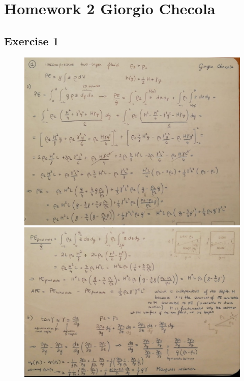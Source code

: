\documentclass[11pt,a4paper]{article}
\begin{document}
	
\section*{Homework 2  \hfill Giorgio Checola}
\subsection{Exercise 1}
\begin{figure}[H]
	\centering 
	\includegraphics[width=150mm]{images/es1.JPEG}
	
	\smallskip
	
	\includegraphics[width=150mm]{images/es1_1.JPEG}
\end{figure}
\end{document}
